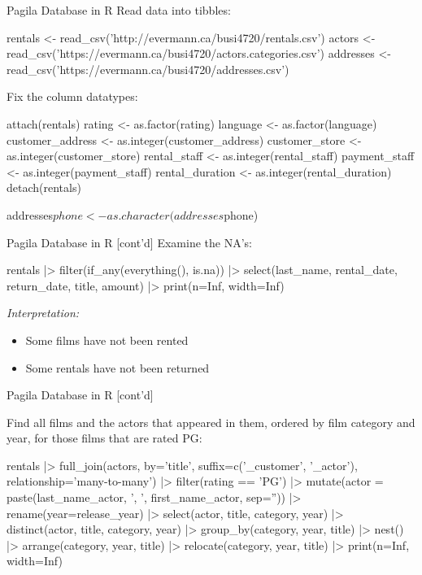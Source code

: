 \documentclass[ignorenonframetext,xcolor=x11names]{beamer}
\begin{document}
\begin{frame}[label=full,fragile]{Pagila Database in R}
Read data into tibbles:
\small
\begin{Rcode}
rentals <- read_csv('http://evermann.ca/busi4720/rentals.csv')
actors <- 
  read_csv('https://evermann.ca/busi4720/actors.categories.csv')
addresses <- 
  read_csv('https://evermann.ca/busi4720/addresses.csv')
\end{Rcode}

Fix the column datatypes:

\footnotesize
\begin{Rcode}
attach(rentals)
rating <- as.factor(rating)
language <- as.factor(language)
customer_address <- as.integer(customer_address)
customer_store <- as.integer(customer_store)
rental_staff <- as.integer(rental_staff)
payment_staff <- as.integer(payment_staff)
rental_duration <- as.integer(rental_duration)
detach(rentals)

addresses$phone <- as.character(addresses$phone)
\end{Rcode}
\end{frame}

\begin{frame}[label=full,fragile]{Pagila Database in R \small [cont'd]}
Examine the NA's:
\footnotesize
\begin{Rcode}
rentals |> 
  filter(if_any(everything(), is.na)) |>
  select(last_name, rental_date, return_date, 
         title, amount) |>
  print(n=Inf, width=Inf)
\end{Rcode}
\normalsize
\emph{Interpretation:}
\begin{itemize}
  \item Some films have not been rented
  \item Some rentals have not been returned
\end{itemize}
\end{frame}

\begin{frame}[label=full,fragile]{Pagila Database in R \small [cont'd]}

Find all films and the actors that appeared in them, ordered by film category and year, for those films that are rated PG:

\scriptsize
\begin{Rcode}
rentals |> 
    full_join(actors, 
        by='title', 
        suffix=c('_customer', '_actor'), 
        relationship='many-to-many') |>
    filter(rating == 'PG') |>
    mutate(actor = 
        paste(last_name_actor, ', ', 
        first_name_actor, sep='')) |>
    rename(year=release_year) |>
    select(actor, title, category, year) |>
    distinct(actor, title, category, year) |>
    group_by(category, year, title) |> 
    nest() |>
    arrange(category, year, title) |>
    relocate(category, year, title) |>
    print(n=Inf, width=Inf)
\end{Rcode}
\end{frame}
\end{document}
